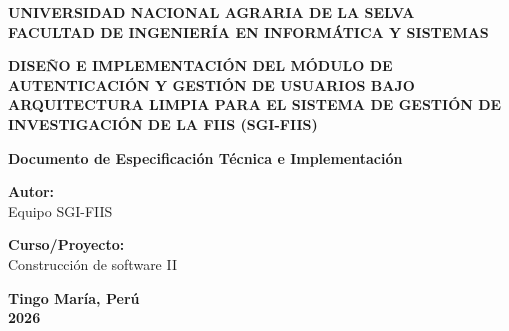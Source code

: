 \documentclass[12pt,letterpaper]{article}
\begin{document}
\begin{titlepage}
    \begin{center}
        \vspace*{1cm}
        
        \large
        \textbf{UNIVERSIDAD NACIONAL AGRARIA DE LA SELVA}\\
        \textbf{FACULTAD DE INGENIERÍA EN INFORMÁTICA Y SISTEMAS}\\
        
        \vspace*{2cm}
        
        \Large
        \textbf{DISEÑO E IMPLEMENTACIÓN DEL MÓDULO DE AUTENTICACIÓN Y GESTIÓN DE USUARIOS BAJO ARQUITECTURA LIMPIA PARA EL SISTEMA DE GESTIÓN DE INVESTIGACIÓN DE LA FIIS (SGI-FIIS)}\\
        
        \vspace*{2.5cm}
        
        \large
        \textbf{Documento de Especificación Técnica e Implementación}\\
        
        \vspace*{2cm}
        
        \textbf{Autor:}\\
        Equipo SGI-FIIS\\
        
        \vspace*{1.5cm}
        
        \textbf{Curso/Proyecto:}\\
        Construcción de software II\\
        
        \vspace*{2cm}
        
        \textbf{Tingo María, Perú}\\
        \textbf{2026}
    \end{center}
\end{titlepage}

\newpage

\end{document}
